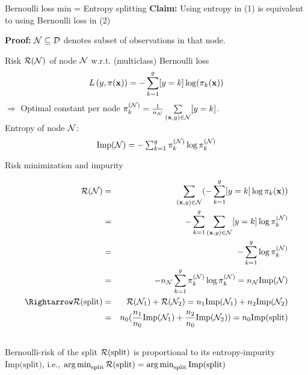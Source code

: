 \documentclass[11pt,compress,t,notes=noshow, xcolor=table]{beamer}
\begin{document}
\begin{frame}{Bernoulli loss min = Entropy splitting}
\textbf{Claim:} Using entropy in (1) 
    is equivalent to using Bernoulli loss in (2) %

\textbf{Proof:} %
$\mathcal{N} \subseteq \mathcal{D}$ denotes subset of observations in that node. 

Risk $\mathcal{R}(\mathcal{N})$ of node $\mathcal{N}$ w.r.t. (multiclass) Bernoulli loss  
$$
  L\left(y, \pi(\mathbf{x})\right) = -\sum_{k = 1}^g [y = k] \log (\pi_k(\mathbf{x}))
$$
$\Rightarrow$ Optimal constant per node $\pi_k^{(\mathcal{N})} = \frac{1}{n_{\mathcal{N}}} \sum\limits_{(\mathbf{x},y) \in \mathcal{N}} [y = k]$.\\

Entropy of node $\mathcal{N}$:
$$
\text{Imp}(\Np) = -\textstyle\sum_{k = 1}^g \pikN \log \pikN %
$$

\end{frame}
\begin{frame2}[footnotesize]{Risk minimization and impurity}

\begin{eqnarray*}
\risk(\Np) &=& \sum_{\xy \in \Np} (- \sum_{k = 1}^g [y = k] \log \pi_k(\xv) ) \\
&=& -\sum_{k = 1}^g \sum_{\xy \in \Np} [y = k]\log \pikN \\
&=& -\sum_{k = 1}^g \log \pikN %
\\
 &=& -n_{\Np} \sum_{k = 1}^g \pikN \log \pikN = n_\Np \text{Imp}(\Np)\\
 \Rightarrow \risk(\text{split}) &=& \risk(\Np_1) + \risk(\Np_2)  = n_1 \text{Imp}(\Np_1) + n_2 \text{Imp}(\Np_2)\\
 &=&n_0 (\frac{n_1}{n_0} \text{Imp}(\Np_1) + \frac{n_2}{n_0} \text{Imp}(\Np_2)) = n_0\text{Imp(split)}\\
\
\end{eqnarray*} 
Bernoulli-risk of the split $\mathcal{R}(\text{split})$ is proportional to its entropy-impurity $\text{Imp(split)}$, i.e., $\mathop{\mathrm{arg\,min}}_\text{split} \mathcal{R}(\text{split}) = \mathop{\mathrm{arg\,min}}_\text{split} \text{Imp(split)}$ \\

\end{frame2}
\end{document}
